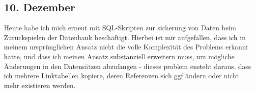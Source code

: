 \subsection{10. Dezember}
Heute habe ich mich erneut mit SQL-Skripten zur sicherung von Daten beim Zurückspielen der Datenbank beschäftigt. Hierbei ist mir aufgefallen, dass ich in meinem ursprünglichen Ansatz nicht die volle Komplexität des Problems erkannt hatte, und dass ich meinen Ansatz substanziell erweitern muss, um mögliche Änderungen in den Datensätzen abzufangen - dieses problem ensteht daraus, dass ich mehrere Linktabellen kopiere, deren Referenzen sich ggf ändern oder nicht mehr existieren werden.
